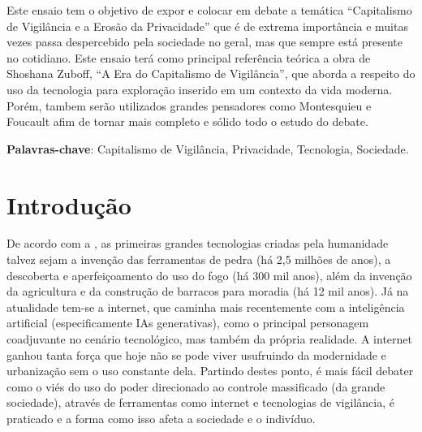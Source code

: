 \documentclass[
	12pt,
	openright,
	twoside,
	a4paper,
	english,
	french,
	spanish,
	brazil
]{abntex2}
\begin{document}
  \frenchspacing
  \imprimircapa
  \imprimirfolhaderosto*

  \setlength{\absparsep}{18pt}
  \begin{resumo}
    Este ensaio tem o objetivo de expor e colocar em debate a temática
    ``Capitalismo de Vigilância e a Erosão da Privacidade'' que é de extrema
    importância e muitas vezes passa despercebido pela sociedade no geral, mas
    que sempre está presente no cotidiano. Este ensaio terá como principal
    referência teórica a obra de Shoshana Zuboff, ``A Era do Capitalismo de
    Vigilância'', que aborda a respeito do uso da tecnologia para exploração
    inserido em um contexto da vida moderna. Porém, tambem serão utilizados
    grandes pensadores como Montesquieu e Foucault afim de tornar mais completo
    e sólido todo o estudo do debate.

    \textbf{Palavras-chave}:
      Capitalismo de Vigilância, Privacidade, Tecnologia, Sociedade.
  \end{resumo}


  \textual

  \chapter{Introdução}

  De acordo com a , as primeiras grandes tecnologias
  criadas pela humanidade talvez sejam a invenção das ferramentas de pedra (há
  2,5 milhões de anos), a descoberta e aperfeiçoamento do uso do fogo (há 300
  mil anos), além da invenção da agricultura e da construção de barracos para
  moradia (há 12 mil anos). Já na atualidade tem-se a internet, que caminha mais
  recentemente com a inteligência artificial (especificamente IAs generativas),
  como o principal personagem coadjuvante no cenário tecnológico, mas também da
  própria realidade. A internet ganhou tanta força que hoje não se pode viver
  usufruindo da modernidade e urbanização sem o uso constante dela. Partindo
  destes ponto, é mais fácil debater como o viés do uso do poder direcionado ao
  controle massificado (da grande sociedade), através de ferramentas como
  internet e tecnologias de vigilância, é praticado e a forma como isso afeta a
  sociedade e o indivíduo.
\end{document}
